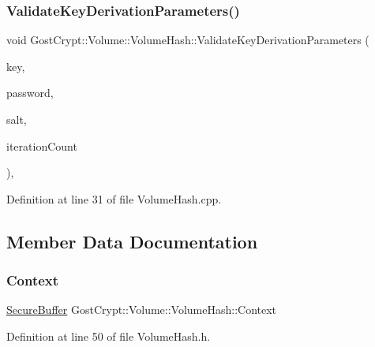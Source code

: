 \subsubsection{\texorpdfstring{Validate\+Key\+Derivation\+Parameters()}{ValidateKeyDerivationParameters()}}
{\footnotesize\ttfamily void Gost\+Crypt\+::\+Volume\+::\+Volume\+Hash\+::\+Validate\+Key\+Derivation\+Parameters (\begin{DoxyParamCaption}\item[{const \hyperlink{class_gost_crypt_1_1_buffer_ptr}{Buffer\+Ptr} \&}]{key,  }\item[{const \hyperlink{class_gost_crypt_1_1_volume_1_1_volume_password}{Volume\+Password} \&}]{password,  }\item[{const \hyperlink{class_gost_crypt_1_1_buffer_ptr}{Buffer\+Ptr} \&}]{salt,  }\item[{int}]{iteration\+Count }\end{DoxyParamCaption})\hspace{0.3cm}{\ttfamily [static]}, {\ttfamily [protected]}}



Definition at line 31 of file Volume\+Hash.\+cpp.



\subsection{Member Data Documentation}
\mbox{\label{class_gost_crypt_1_1_volume_1_1_volume_hash_af86026af3ee2eb5aaf1feb6fac344446}} 
\subsubsection{\texorpdfstring{Context}{Context}}
{\footnotesize\ttfamily \hyperlink{class_gost_crypt_1_1_secure_buffer}{Secure\+Buffer} Gost\+Crypt\+::\+Volume\+::\+Volume\+Hash\+::\+Context\hspace{0.3cm}{\ttfamily [protected]}}



Definition at line 50 of file Volume\+Hash.\+h.

\mbox{\label{class_gost_crypt_1_1_volume_1_1_volume_hash_aacecbfb38eed1790e8d25a594a4b194e}} 
